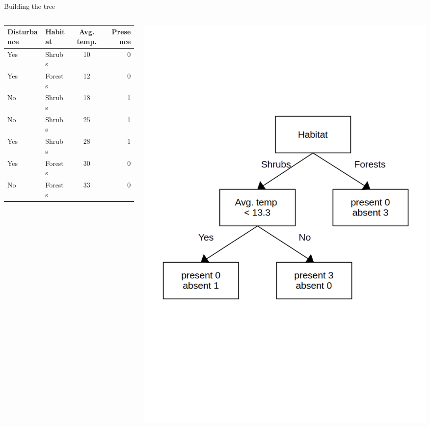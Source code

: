 \documentclass{irdbeamer}
\begin{document}
\begin{frame}{Building the tree}
\begin{columns}
    \begin{column}{0.5\textwidth}
\centering
{\small
\begin{tabular}{llc|r}
    \toprule
    Disturbance & Habitat & Avg. temp. & Presence \\
    \midrule
    Yes & Shrubs    & 10 & 0 \\
    Yes & Forests   & 12 & 0 \\
    No  & Shrubs    & 18 & 1 \\
    No  & Shrubs    & 25 & 1 \\
    Yes & Shrubs    & 28 & 1 \\
    Yes & Forests   & 30 & 0 \\
    No  & Forests   & 33 & 0 \\
    \bottomrule
\end{tabular}
        }
    \end{column}
    \begin{column}{0.5\textwidth}
\centering
    \includegraphics[width=.8\textwidth]{./figs/schemas/tree.png}%
\end{column}
\end{columns}
\end{frame}
\end{document}
